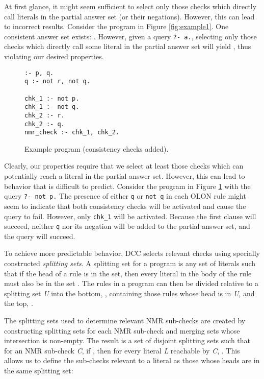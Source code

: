 \documentclass{new_tlp}
\begin{document}
At first glance, it might seem sufficient to select only those checks which 
directly call literals in the partial answer set (or their negations). However, 
this can lead to incorrect results. Consider the program in Figure 
\ref{fig:example1}. One consistent answer set exists:
.
However, given a query \texttt{?- a.}, selecting only those checks which
directly call some literal in the partial answer set will yield
, thus violating our desired properties.

\begin{figure}
\figrule
\begin{verbatim}
:- p, q.
q :- not r, not q.

chk_1 :- not p.
chk_1 :- not q.
chk_2 :- r.
chk_2 :- q.
nmr_check :- chk_1, chk_2.
\end{verbatim}
\caption{Example program (consistency checks added).} \label{fig:example2}
\figrule
\end{figure}

Clearly, our properties require that we select at least those checks which can 
potentially reach a literal in the partial answer set. However, this can lead 
to behavior that is difficult to predict. Consider the program in Figure 
\ref{fig:example2} with the query \texttt{?- not p.} The presence of either
\texttt{q} or \texttt{not q} in each OLON rule might seem to indicate that both
consistency checks will be activated and cause the query to fail. However, only
\texttt{chk\_1} will be activated. Because the first clause will succeed,
neither \texttt{q} nor its negation will be added to the partial answer set,
and the query will succeed.

To achieve more predictable behavior, DCC selects relevant checks using 
specially constructed \textit{splitting sets}. A splitting set for a program is 
any set of literals such that if the head of a rule is in the set, then every 
literal in the body of the rule must also be in the set \cite{splitting}. The 
rules in a program  can then be divided relative to a splitting set 
\textit{U} into the bottom, , containing those rules whose head is in
\textit{U}, and the top, .

The splitting sets used to determine relevant NMR sub-checks are created by 
constructing splitting sets for each NMR sub-check and merging sets whose 
intersection is non-empty. The result is a set of disjoint splitting sets 
 such that for an NMR sub-check \textit{C}, if , then for 
every literal \textit{L} reachable by \textit{C}, . This allows us 
to define the sub-checks relevant to a literal as those whose heads are in the 
same splitting set:
\end{document}
